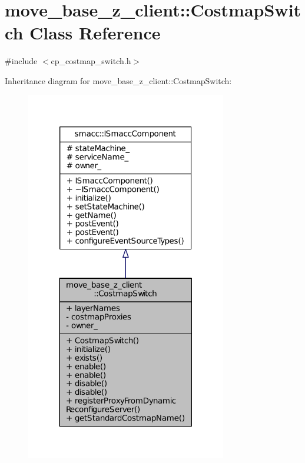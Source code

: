\hypertarget{classmove__base__z__client_1_1CostmapSwitch}{}\section{move\+\_\+base\+\_\+z\+\_\+client\+:\+:Costmap\+Switch Class Reference}
\label{classmove__base__z__client_1_1CostmapSwitch}


{\ttfamily \#include $<$cp\+\_\+costmap\+\_\+switch.\+h$>$}



Inheritance diagram for move\+\_\+base\+\_\+z\+\_\+client\+:\+:Costmap\+Switch\+:
\nopagebreak
\begin{figure}[H]
\begin{center}
\leavevmode
\includegraphics[width=248pt]{classmove__base__z__client_1_1CostmapSwitch__inherit__graph}
\end{center}
\end{figure}


